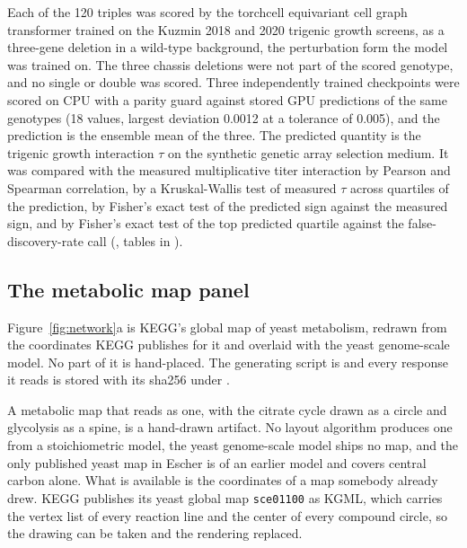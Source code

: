 Each of the 120 triples was scored by the torchcell equivariant cell graph transformer
trained on the Kuzmin 2018 and 2020 trigenic growth screens, as a three-gene deletion in a
wild-type background, the perturbation form the model was trained on. The three chassis
deletions were not part of the scored genotype, and no single or double was scored. Three
independently trained checkpoints were scored on CPU with a parity guard against stored GPU
predictions of the same genotypes (18 values, largest deviation 0.0012 at a tolerance of
0.005), and the prediction is the ensemble mean of the three. The predicted quantity is the
trigenic growth interaction $\tau$ on the synthetic genetic array selection medium. It was
compared with the measured multiplicative titer interaction by Pearson and Spearman
correlation, by a Kruskal-Wallis test of measured $\tau$ across quartiles of the prediction,
by Fisher's exact test of the predicted sign against the measured sign, and by Fisher's
exact test of the top predicted quartile against the false-discovery-rate call
(, tables in
).

\subsection*{The metabolic map panel}

Figure~\ref{fig:network}a is KEGG's global map of yeast metabolism, redrawn from the
coordinates KEGG publishes for it and overlaid with the yeast genome-scale model. No part
of it is hand-placed. The generating script is
 and every response it reads is
stored with its sha256 under .

 A metabolic map that reads as
one, with the citrate cycle drawn as a circle and glycolysis as a spine, is a hand-drawn
artifact. No layout algorithm produces one from a stoichiometric model, the yeast
genome-scale model ships no map, and the only published yeast map in Escher is of an
earlier model and covers central carbon alone. What is available is the coordinates of a
map somebody already drew. KEGG publishes its yeast global map \texttt{sce01100} as KGML,
which carries the vertex list of every reaction line and the center of every compound
circle, so the drawing can be taken and the rendering replaced.

